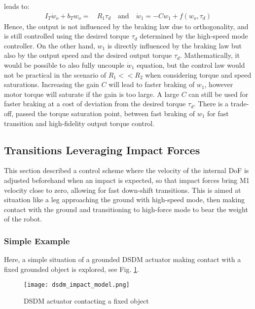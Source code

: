 leads  to:
\begin{align}
I_T \dot{w}_o +
b_T  w_o
=& \, R_1 \tau_d  \quad \text{and} \quad \dot{w}_1 = -C w_1 + f(w_o,\tau_d) %
\end{align}
Hence, the output is not influenced by the braking law due to orthogonality, and is still controlled using the desired torque $\tau_d$ determined by the high-speed mode controller. On the other hand, $w_1$ is directly influenced by the braking law but also by the output speed and the desired output torque $\tau_d$. Mathematically, it would be possible to also fully uncouple $\dot{w}_1$ equation, but the control law would not be practical in the scenario of $R_1<<R_2$ when considering torque and speed saturations. Increasing the gain $C$ will lead to faster braking of $w_1$, however motor torque will saturate if the gain is too large. A large $C$ can still be used for faster braking at a cost of deviation from the desired torque $\tau_d$. There is a trade-off, passed the torque saturation point, between fast braking of $w_1$ for fast transition and high-fidelity output torque control.



\subsection{Transitions Leveraging Impact Forces}

This section described a control scheme where the velocity of the internal DoF is adjusted beforehand when an impact is expected, so that impact forces bring M1 velocity close to zero, allowing for fast down-shift transitions. This is aimed at situation like a leg approaching the ground with high-speed mode, then making contact with the ground and transitioning to high-force mode to bear the weight of the robot.

\subsubsection{Simple Example}

Here, a simple situation of a grounded DSDM actuator making contact with a fixed grounded object is explored, see Fig. \ref{fig:dsdm_impact_model}.

\begin{figure}[htbp]
	\centering
		\texttt{[image: dsdm\_impact\_model.png]}
	\caption{DSDM actuator contacting a fixed object}
	\label{fig:dsdm_impact_model}
\end{figure}

